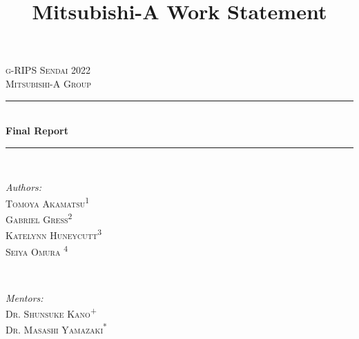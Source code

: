 \documentclass{article}
\title{Mitsubishi-A Work Statement}
\author{}
\date{}
\numberwithin{equation}{section}
\theoremstyle{definition}
\begin{document}
\nocite{*}%


\begin{titlepage}

\newcommand{\HRule}{\rule{\linewidth}{0.5mm}} %

\center %
 

\textsc{\LARGE g-RIPS Sendai 2022}\\[1.5cm] %
\textsc{\Large Mitsubishi-A Group}\\[0.5cm] %


\HRule \\[0.4cm]
{ \huge \bfseries Final Report }\\[0.4cm] %
\HRule \\[1.5cm]
 

\begin{minipage}{0.4\textwidth}
\begin{flushleft} \large
\emph{Authors:}\\
 \textsc{Tomoya Akamatsu}\textsuperscript{1} \\ %
 \textsc{Gabriel Gress}\textsuperscript{2}\\
 \textsc{Katelynn Huneycutt}\textsuperscript{3}\\
  \textsc{Seiya Omura }\textsuperscript{4}\\
\end{flushleft}
\end{minipage}
~
\begin{minipage}{0.4\textwidth}
\begin{flushright} \large
\emph{Mentors:} \\
 \textsc{Dr. Shunsuke Kano}\textsuperscript{+}\\%
 \textsc{Dr. Masashi Yamazaki}\textsuperscript{*} 
\end{flushright}
\end{minipage}\\[0.5cm]
\center\begin{minipage}{0.35\textwidth}
\begin{flushleft}\small


\end{flushleft}
\end{minipage}
\end{titlepage}
\end{document}
